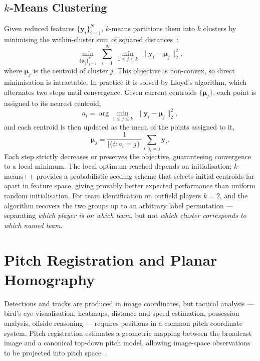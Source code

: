 \subsection{$k$-Means Clustering}
\label{subsec:team_id_kmeans}

Given reduced features \(\{\mathbf{y}_i\}_{i=1}^{N}\), 
\(k\)-means partitions them into \(k\) clusters by 
minimising the within-cluster sum of squared 
distances~\cite{MacQueen1967}:
\begin{equation}
    \min_{\{\boldsymbol{\mu}_j\}_{j=1}^{k}}\;
    \sum_{i=1}^{N}\;
    \min_{1 \leq j \leq k}\,
    \lVert \mathbf{y}_i - \boldsymbol{\mu}_j \rVert_2^{2},
    \label{eq:kmeans_objective}
\end{equation}
where \(\boldsymbol{\mu}_j\) is the centroid of cluster \(j\).
This objective is non-convex, so direct minimisation is 
intractable. In practice it is solved by Lloyd's algorithm, 
which alternates two steps until convergence. Given current 
centroids \(\{\boldsymbol{\mu}_j\}\), each point is 
assigned to its nearest centroid,
\[
    a_i = \arg\min_{1 \leq j \leq k}\,
    \lVert \mathbf{y}_i - \boldsymbol{\mu}_j \rVert_2^{2},
\]
and each centroid is then updated as the mean of the 
points assigned to it,
\[
    \boldsymbol{\mu}_j =
    \frac{1}{|\{i : a_i = j\}|}
    \sum_{i : a_i = j} \mathbf{y}_i.
\]
Each step strictly decreases or preserves the objective, 
guaranteeing convergence to a local minimum. The local 
optimum reached depends on initialisation; \(k\)-means++ 
provides a probabilistic seeding scheme that selects 
initial centroids far apart in feature space, giving 
provably better expected performance than uniform random 
initialisation. For team identification on outfield 
players \(k = 2\), and the algorithm recovers the two 
groups up to an arbitrary label permutation — separating 
\emph{which player is on which team}, but not 
\emph{which cluster corresponds to which named team}.

\section{Pitch Registration and Planar Homography}
\label{sec:background_homography}

Detections and tracks are produced in image coordinates, 
but tactical analysis — bird's-eye visualisation, 
heatmaps, distance and speed estimation, possession 
analysis, offside reasoning — requires positions in a 
common pitch coordinate system. Pitch registration 
estimates a geometric mapping between the broadcast image 
and a canonical top-down pitch model, allowing image-space 
observations to be projected into pitch 
space~\cite{Theiner2022,TVCalib2023}.

